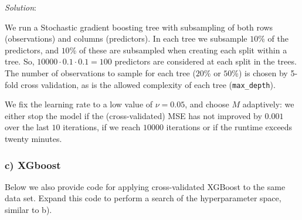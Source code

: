 \documentclass[
]{article}
\newenvironment{Shaded}{\begin{snugshade}}{\end{snugshade}}
\newcommand{\AttributeTok}[1]{\textcolor[rgb]{0.13,0.29,0.53}{#1}}
\newcommand{\CommentTok}[1]{\textcolor[rgb]{0.56,0.35,0.01}{\textit{#1}}}
\newcommand{\ConstantTok}[1]{\textcolor[rgb]{0.56,0.35,0.01}{#1}}
\newcommand{\DecValTok}[1]{\textcolor[rgb]{0.00,0.00,0.81}{#1}}
\newcommand{\FloatTok}[1]{\textcolor[rgb]{0.00,0.00,0.81}{#1}}
\newcommand{\FunctionTok}[1]{\textcolor[rgb]{0.13,0.29,0.53}{\textbf{#1}}}
\newcommand{\NormalTok}[1]{#1}
\newcommand{\OtherTok}[1]{\textcolor[rgb]{0.56,0.35,0.01}{#1}}
\newcommand{\SpecialCharTok}[1]{\textcolor[rgb]{0.81,0.36,0.00}{\textbf{#1}}}
\begin{document}
\emph{Solution}:

We run a Stochastic gradient boosting tree with subsampling of both rows
(observations) and columns (predictors). In each tree we subsample
\(10\)\% of the predictors, and \(10\)\% of these are subsampled when
creating each split within a tree. So,
\(10 000 \cdot 0.1\cdot 0.1 = 100\) predictors are considered at each
split in the trees. The number of observations to sample for each tree
(\(20\)\% or \(50\)\%) is chosen by 5-fold cross validation, as is the
allowed complexity of each tree (\texttt{max\_depth}).

We fix the learning rate to a low value of \(\nu = 0.05\), and choose
\(M\) adaptively: we either stop the model if the (cross-validated) MSE
has not improved by \(0.001\) over the last \(10\) iterations, if we
reach \(10000\) iterations or if the runtime exceeds twenty minutes.

\subsubsection{c) XGboost}\label{c-xgboost}

Below we also provide code for applying cross-validated XGBoost to the
same data set. Expand this code to perform a search of the
hyperparameter space, similar to b).

\begin{Shaded}
\end{Shaded}
\end{document}

